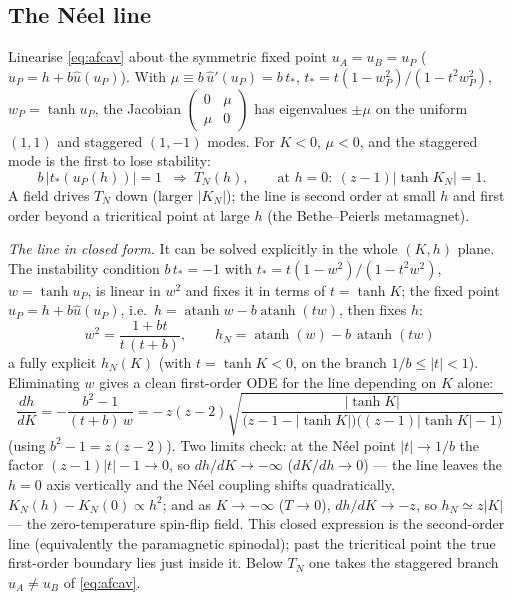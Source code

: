 \documentclass[11pt]{article}
\newcommand{\atanh}{\operatorname{atanh}}
\begin{document}
\subsection{The N\'eel line}
Linearise \eqref{eq:afcav} about the symmetric fixed point $u_A=u_B=u_P$ ($u_P=h+b\hat u(u_P)$). With
$\mu\equiv b\,\hat u'(u_P)=b\,t_*$, $t_*=t(1-w_P^2)/(1-t^2w_P^2)$, $w_P=\tanh u_P$, the Jacobian
$\left(\begin{smallmatrix}0&\mu\\\mu&0\end{smallmatrix}\right)$ has eigenvalues $\pm\mu$ on the uniform
$(1,1)$ and staggered $(1,-1)$ modes. For $K<0$, $\mu<0$, and the staggered mode is the first to lose
stability:
\begin{equation}
\boxed{\;b\,|t_*(u_P(h))|=1\;}\ \Longrightarrow\ T_N(h),\qquad
\text{at }h=0:\ (z-1)|\tanh K_N|=1 .
\end{equation}
A field drives $T_N$ down (larger $|K_N|$); the line is second order at small $h$ and first order beyond
a tricritical point at large $h$ (the Bethe--Peierls metamagnet).

\emph{The line in closed form.} It can be solved explicitly in the whole $(K,h)$ plane. The instability
condition $b\,t_*=-1$ with $t_*=t(1-w^2)/(1-t^2w^2)$, $w=\tanh u_P$, is linear in $w^2$ and fixes it in
terms of $t=\tanh K$; the fixed point $u_P=h+b\hat u(u_P)$, i.e.\ $h=\atanh w-b\atanh(tw)$, then fixes
$h$:
\begin{equation}
\boxed{\;w^2=\frac{1+bt}{t\,(t+b)},\qquad h_N=\atanh(w)-b\,\atanh(tw)\;}
\end{equation}
a fully explicit $h_N(K)$ (with $t=\tanh K<0$, on the branch $1/b\le|t|<1$). Eliminating $w$ gives a
clean first-order ODE for the line depending on $K$ alone:
\begin{equation}
\boxed{\;\frac{dh}{dK}=-\frac{b^2-1}{(t+b)\,w}=-\,z(z-2)\sqrt{\frac{|\tanh K|}
{\big(z{-}1{-}|\tanh K|\big)\big((z{-}1)|\tanh K|-1\big)}}\;}
\end{equation}
(using $b^2-1=z(z-2)$). Two limits check: at the N\'eel point $|t|\to1/b$ the factor
$(z{-}1)|t|-1\to0$, so $dh/dK\to-\infty$ ($dK/dh\to0$) --- the line leaves the $h=0$ axis vertically and
the N\'eel coupling shifts quadratically, $K_N(h)-K_N(0)\propto h^2$; and as $K\to-\infty$ ($T\to0$),
$dh/dK\to-z$, so $h_N\simeq z|K|$ --- the zero-temperature spin-flip field. This closed expression is the
second-order line (equivalently the paramagnetic spinodal); past the tricritical point the true
first-order boundary lies just inside it. Below $T_N$ one takes the staggered branch $u_A\neq u_B$ of
\eqref{eq:afcav}.
\end{document}

